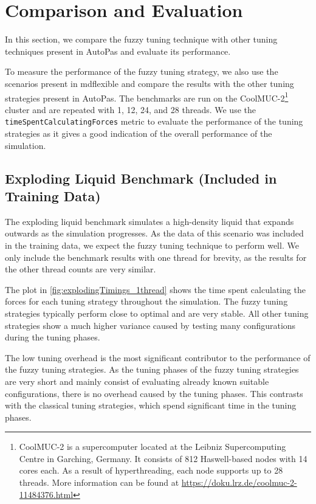 \chapter{Comparison and Evaluation}
\label{sec:comparison_and_evaluation}

In this section, we compare the fuzzy tuning technique with other tuning techniques present in AutoPas and evaluate its performance.

To measure the performance of the fuzzy tuning strategy, we also use the scenarios present in \gls{mdflexible} and compare the results with the other tuning strategies present in AutoPas. The benchmarks are run on the CoolMUC-2\footnote{\label{CoolMucSpecs}CoolMUC-2 is a supercomputer located at the Leibniz Supercomputing Centre in Garching, Germany. It consists of 812 Haswell-based nodes with 14 cores each. As a result of hyperthreading, each node supports up to 28 threads. More information can be found at \url{https://doku.lrz.de/coolmuc-2-11484376.html}} cluster and are repeated with 1, 12, 24, and 28 threads. We use the \texttt{timeSpentCalculatingForces} metric to evaluate the performance of the tuning strategies as it gives a good indication of the overall performance of the simulation.


\section{Exploding Liquid Benchmark (Included in Training Data)}

The exploding liquid benchmark simulates a high-density liquid that expands outwards as the simulation progresses. As the data of this scenario was included in the training data, we expect the fuzzy tuning technique to perform well. We only include the benchmark results with one thread for brevity, as the results for the other thread counts are very similar.

The plot in \autoref{fig:explodingTimings_1thread} shows the time spent calculating the forces for each tuning strategy throughout the simulation. The fuzzy tuning strategies typically perform close to optimal and are very stable. All other tuning strategies show a much higher variance caused by testing many configurations during the tuning phases.

The low tuning overhead is the most significant contributor to the performance of the fuzzy tuning strategies. As the tuning phases of the fuzzy tuning strategies are very short and mainly consist of evaluating already known suitable configurations, there is no overhead caused by the tuning phases. This contrasts with the classical tuning strategies, which spend significant time in the tuning phases.

